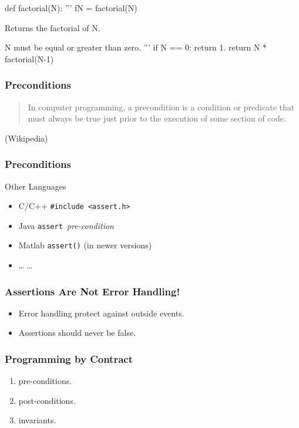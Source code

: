 \begin{frame}[fragile]
\frametitle{}

\begin{python}
def factorial(N):
    '''
    fN = factorial(N)

    Returns the factorial of N.

    N must be equal or greater than zero.
    '''
    if N == 0:
        return 1.
    return N * factorial(N-1)
\end{python}
\end{frame}

\begin{frame}[fragile]
\frametitle{Preconditions}

\begin{quote}
In computer programming, a precondition is a condition or predicate that must always be true just prior to the execution of some section of code.
\end{quote}

\begin{flushright}
(Wikipedia)
\end{flushright}

\end{frame}

\begin{frame}[fragile]
\frametitle{Preconditions}
\begin{block}{Other Languages}
\begin{itemize}
\item \alert{C/C++} \lstinline{#include <assert.h>}
\item \alert{Java} \lstinline{assert }\textit{pre-condition}
\item \alert{Matlab} \lstinline{assert()} (in newer versions)
\item \alert{\ldots} \ldots
\end{itemize}
\end{block}
\end{frame}

\begin{frame}[fragile]
\frametitle{Assertions Are Not Error Handling!}

\begin{itemize}
\item Error handling protect against outside events.
\item Assertions \alert{should never} be false.
\end{itemize}
\end{frame}

\begin{frame}[fragile]
\frametitle{Programming by Contract}
\begin{enumerate}
\item pre-conditions.
\item post-conditions.
\item invariants.
\end{enumerate}
\end{frame}


